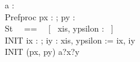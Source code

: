 \begin{circus}
\circchannel a : \nat \cross \nat \\
\circprocess Prefproc \circdef 
    px : \nat ; py : \nat \circspot 
    \circbegin \\
	\circstate St ~~==~~ [~ xis, ypsilon : \nat ~] \\
	INIT \circdef ix : \nat; iy : \nat \circspot xis, ypsilon := ix, iy \\
	\circspot INIT (px, py) \circseq
	    a?x?y \then \Skip \\
	\circend \\
\end{circus}

